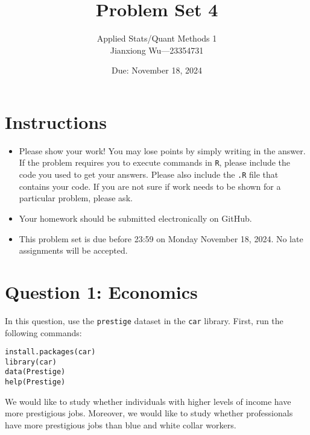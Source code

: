 \documentclass[12pt,letterpaper]{article}
\title{Problem Set 4}
\date{Due: November 18, 2024}
\author{Applied Stats/Quant Methods 1
	\\ Jianxiong Wu---23354731}
\begin{document}
	\maketitle
	\section*{Instructions}
	\begin{itemize}
		\item Please show your work! You may lose points by simply writing in the answer. If the problem requires you to execute commands in \texttt{R}, please include the code you used to get your answers. Please also include the \texttt{.R} file that contains your code. If you are not sure if work needs to be shown for a particular problem, please ask.
		\item Your homework should be submitted electronically on GitHub.
		\item This problem set is due before 23:59 on Monday November 18, 2024. No late assignments will be accepted.
	\end{itemize}



	\vspace{.5cm}
\section*{Question 1: Economics}
\vspace{.25cm}
\noindent 	
In this question, use the \texttt{prestige} dataset in the \texttt{car} library. First, run the following commands:

\begin{verbatim}
install.packages(car)
library(car)
data(Prestige)
help(Prestige)
\end{verbatim} 


\noindent We would like to study whether individuals with higher levels of income have more prestigious jobs. Moreover, we would like to study whether professionals have more prestigious jobs than blue and white collar workers.
\end{document}

